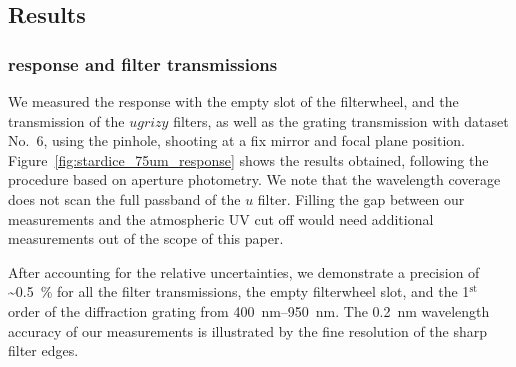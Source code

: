 %
%
%
%

\subsection{Results}
\subsubsection{\SD response and filter transmissions}

We measured the \SD response with the empty slot of the filterwheel, and the transmission of the $ugrizy$ filters, as well as the grating transmission with dataset No.~6, using the \spinhole pinhole, shooting at a fix mirror and focal plane position. Figure~\ref{fig:stardice_75um_response} shows the results obtained, following the procedure based on aperture photometry. We note that the wavelength coverage does not scan the full passband of the $u$ filter. Filling the gap between our measurements and the atmospheric UV cut off would need additional measurements out of the scope of this paper.

After accounting for the relative uncertainties, we demonstrate a precision of \textasciitilde\SI{0.5}{\%} for all the filter transmissions, the empty filterwheel slot, and the 1$^\mathrm{st}$ order of the diffraction grating from \SIrange{400}{950}{\nano\meter}. The \SI{0.2}{nm} wavelength accuracy of our measurements is illustrated by the fine resolution of the sharp filter edges.



